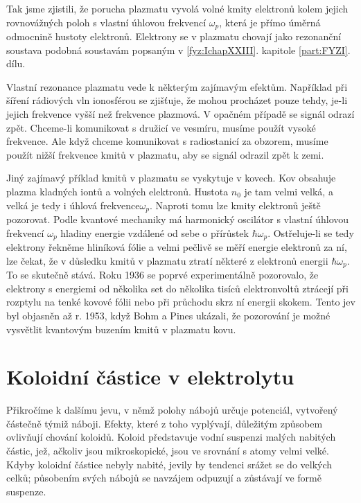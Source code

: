   Tak jsme zjistili, že porucha plazmatu vyvolá volné kmity elektronů kolem jejich rovnovážných
  poloh s vlastní úhlovou frekvencí \(ω_p\), která je přímo úměrná odmocnině hustoty elektronů.
  Elektrony se v plazmatu chovají jako rezonanční soustava podobná soustavám popsaným v
  \ref{fyz:IchapXXIII}. kapitole \ref{part:FYZI}. dílu.

  Vlastní rezonance plazmatu vede k některým zajímavým efektům. Například při šíření rádiových vln
  ionosférou se zjišťuje, že mohou procházet pouze tehdy, je-li jejich frekvence vyšší než frekvence
  plazmová. V opačném případě se signál odrazí zpět. Chceme-li komunikovat s družicí ve vesmíru,
  musíme použít vysoké frekvence. Ale když chceme komunikovat s radiostanicí za obzorem, musíme
  použít nižší frekvence kmitů v plazmatu, aby se signál odrazil zpět k zemi. 
  
  Jiný zajímavý příklad kmitů v plazmatu se vyskytuje v kovech. Kov obsahuje plazma kladných iontů a
  volných elektronů. Hustota \(n_0\) je tam velmi velká, a velká je tedy i úhlová frekvence\(ω_p\).
  Naproti tomu lze kmity elektronů ještě pozorovat. Podle kvantové mechaniky má harmonický oscilátor
  s vlastní úhlovou frekvencí \(ω_p\) hladiny energie vzdálené od sebe o přírůstek \(ℏω_p\).
  Ostřeluje-li se tedy elektrony řekněme hliníková fólie a velmi pečlivě se měří energie elektronů
  za ní, lze čekat, že v důsledku kmitů v plazmatu ztratí některé z elektronů energii \(ℏω_p\). To
  se skutečně stává. Roku 1936 se poprvé experimentálně pozorovalo, že elektrony s energiemi od
  několika set do několika tisíců elektronvoltů ztrácejí při rozptylu na tenké kovové fólii nebo při
  průchodu skrz ní energii skokem. Tento jev byl objasněn až r. 1953, když Bohm a Pines ukázali,
  že pozorování je možné vysvětlit kvantovým buzením kmitů v plazmatu kovu.

\section{Koloidní částice v elektrolytu}\label{fyz:IIchapVsecXXV}
  Přikročíme k dalšímu jevu, v němž polohy nábojů určuje potenciál, vytvořený částečně týmiž náboji.
  Efekty, které z toho vyplývají, důležitým způsobem ovlivňují chování koloidů. Koloid představuje
  vodní suspenzi malých nabitých částic, jež, ačkoliv jsou mikroskopické, jsou ve srovnání s atomy
  velmi velké. Kdyby koloidní částice nebyly nabité, jevily by tendenci srážet se do velkých celků;
  působením svých nábojů se navzájem odpuzují a zůstávají ve formě suspenze.

